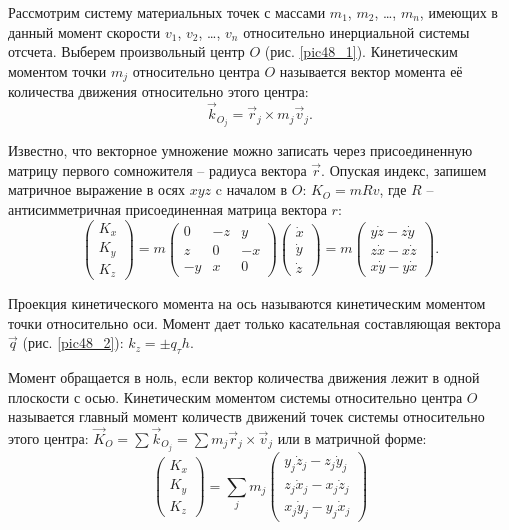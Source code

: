 
Рассмотрим систему материальных точек с массами \( m_1 \), \( m_2 \), \ldots,
\( m_n \), имеющих в данный момент скорости \( v_1 \), \( v_2 \), \ldots,
\( v_n \) относительно инерциальной системы отсчета. Выберем произвольный центр
\( O \) (рис. \ref{pic48_1}). Кинетическим моментом точки \( m_j \) относительно центра \( O \)
называется вектор момента её количества движения относительно этого центра:
\[
    \vec{k}_{O_j} = \vec{r}_j \times m_j\vec{v}_j.
\]

Известно, что векторное умножение можно записать через присоединенную матрицу
первого сомножителя -- радиуса вектора \( \vec{r} \). Опуская индекс, запишем
матричное выражение в осях \( xyz \) c началом в \( O \): \( K_O = mRv \), где
\( R \) -- антисимметричная присоединенная матрица вектора \( r \):
\[
    \begin{pmatrix} K_x \\ K_y \\ K_z \end{pmatrix} =
    m\begin{pmatrix} 0 & -z & y \\ z & 0 & -x \\ -y & x & 0 \end{pmatrix}
    \begin{pmatrix} \dot{x} \\ \dot{y} \\ \dot{z} \end{pmatrix} = 
    m\begin{pmatrix} y\dot{z} - z\dot{y} \\ z\dot{x} - x\dot{z} \\
    x\dot{y} - y\dot{x} \end{pmatrix}.
\]
 
Проекция кинетического момента на ось называются кинетическим моментом точки
относительно оси. Момент дает только касательная составляющая вектора
\( \vec{q} \) (рис. \ref{pic48_2}): \( k_z = \pm q_\tau h \).

Момент обращается в ноль, если вектор количества движения лежит в одной
плоскости с осью. Кинетическим моментом системы относительно центра \( O \)
называется главный момент количеств движений точек системы относительно этого
центра: \( \vec{K}_O = \sum \vec{k}_{O_j} = \sum m_j \vec{r}_j \times
\vec{v}_j \) или в матричной форме:
\[
    \begin{pmatrix} K_x \\ K_y \\ K_z \end{pmatrix} = \sum_j m_j
    \begin{pmatrix} y_j\dot{z}_j - z_j\dot{y}_j \\ z_j\dot{x}_j - x_j\dot{z}_j
    \\ x_j\dot{y}_j - y_j\dot{x}_j \end{pmatrix}
\]

